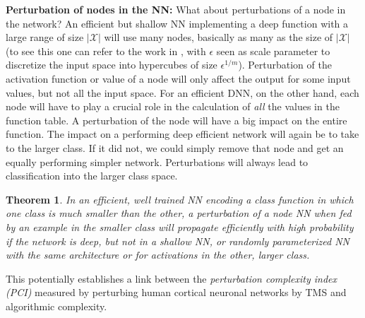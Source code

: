 \documentclass[11pt]{amsart}
\newcommand{\inputspace}{\mathcal X}
\newtheorem{theorem}{Theorem} %
\begin{document}
{\bf Perturbation of nodes in  the NN:}
What about perturbations of a  node in the network? An efficient but shallow NN implementing a deep function with a large range of size $|\inputspace|$ will use many nodes, basically as many as the size of $|\inputspace|$ (to see this one can refer to the work in \cite{Mhaskar:2016aa}, with $\epsilon$ seen as scale parameter to discretize the input space into hypercubes of size $\epsilon^{1/m}$). Perturbation of the activation function or value  of a node will only affect the output for some input values, but not all the input space.  For an efficient DNN, on the other hand, each node will have to play a crucial role in the calculation of {\em all} the values in the function table. A perturbation of the node will have a big impact on the entire function.  The impact on a performing deep efficient network will again be to take to the larger class. If it did not, we could simply remove that node and get an equally performing simpler network.  Perturbations will always lead to classification into the larger class space.

\begin{theorem} In an efficient, well trained NN encoding a  class function in which one class is much smaller than the other,  a perturbation of a node  NN  when fed by an example in the smaller class will propagate efficiently with high probability if the network is deep, but not in a shallow NN, or randomly parameterized NN with the same architecture or for activations in the other, larger class.
\end{theorem}


This potentially establishes a  link between the {\em perturbation complexity index (PCI)} measured by perturbing human cortical neuronal networks by TMS   \cite{Casali:2013aa} and algorithmic complexity. 
\end{document}
